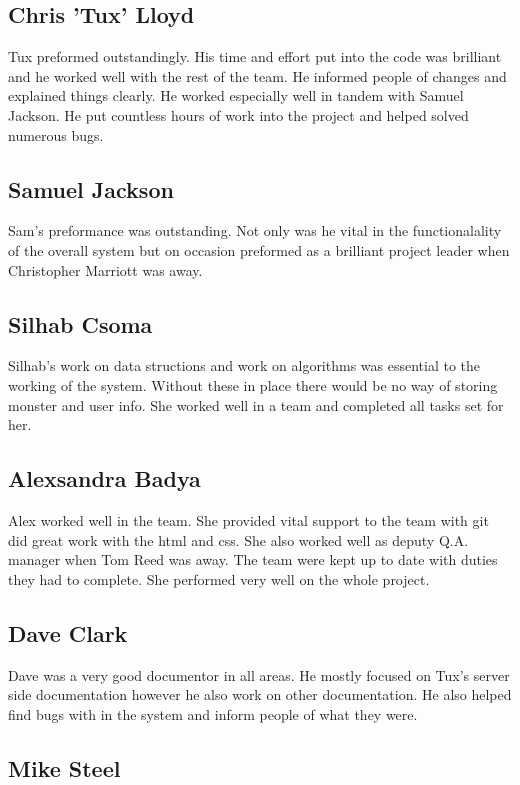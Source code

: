 \documentclass{project}
\begin{document}
\subsection{Chris 'Tux' Lloyd}
Tux preformed outstandingly. His time and effort put into the code was brilliant and he worked well with the rest of the team. He informed people of changes and explained things clearly. He worked especially well in tandem with Samuel Jackson. He put countless hours of work into the project and helped solved numerous bugs.

\subsection{Samuel Jackson}
Sam's preformance was outstanding. Not only was he vital in the functionalality of the overall system but on occasion preformed as a brilliant project leader when Christopher Marriott was away. 

\subsection{Silhab Csoma}
Silhab's work on data structions and work on algorithms was essential to the working of the system. Without these in place there would be no way of storing monster and user info. She worked well in a team and completed all tasks set for her.

\subsection{Alexsandra Badya}
Alex worked well in the team. She provided vital support to the team with git did great work with the html and css. She also worked well as deputy Q.A. manager when Tom Reed was away. The team were kept up to date with duties they had to complete. She performed very well on the whole project.

\subsection{Dave Clark}
Dave was a very good documentor in all areas. He mostly focused on Tux's server side documentation however he also work on other documentation. He also helped find bugs with in the system and inform people of what they were.

\subsection{Mike Steel}
\end{document}
